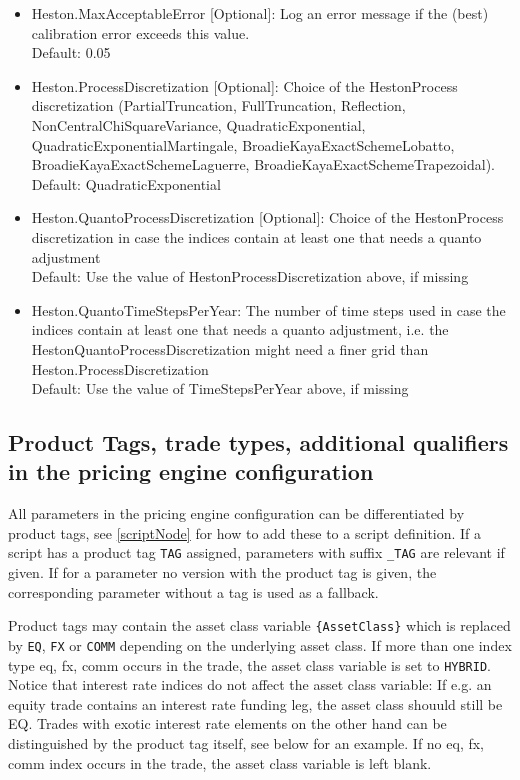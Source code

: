 \begin{itemize}
\begin{itemize}
    (root mean squared error of implied black volatilities) is below this tolerance. \\
    Default: 0.005
  \item Heston.MaxAcceptableError [Optional]: Log an error message if the (best) calibration error exceeds this value.\\
    Default: 0.05
  \item Heston.ProcessDiscretization [Optional]: Choice of the HestonProcess discretization (PartialTruncation, FullTruncation,
    Reflection, NonCentral\-Chi\-SquareVariance, Quadratic\-Exponential, Quadratic\-Exponential\-Martingale,
    Broadie\-Kaya\-Exact\-SchemeLobatto, Broadie\-Kaya\-Exact\-SchemeLaguerre, BroadieKayaExactSchemeTrapezoidal). \\
    Default: QuadraticExponential
  \item Heston.QuantoProcessDiscretization [Optional]: Choice of the HestonProcess discretization in case the indices contain
    at least one that needs a quanto adjustment \\
    Default: Use the value of HestonProcessDiscretization above, if missing
  \item Heston.QuantoTimeStepsPerYear: The number of time steps used in case the indices contain
    at least one that needs a quanto adjustment, i.e. the HestonQuantoProcessDiscretization might need a finer grid than
    Heston.ProcessDiscretization \\
    Default: Use the value of TimeStepsPerYear above, if missing
  \end{itemize}
\end{itemize}


\subsection{Product Tags, trade types, additional qualifiers in the pricing engine configuration}\label{producttags_engineconfig}

All parameters in the pricing engine configuration can be differentiated by product tags, see \ref{scriptNode} for how
to add these to a script definition. If a script has a product tag \verb+TAG+ assigned, parameters with suffix
\verb+_TAG+ are relevant if given. If for a parameter no version with the product tag is given, the corresponding
parameter without a tag is used as a fallback.

Product tags may contain the asset class variable \verb+{AssetClass}+ which is replaced by \verb+EQ+, \verb+FX+ or
\verb+COMM+ depending on the underlying asset class. If more than one index type eq, fx, comm occurs in the trade, the
asset class variable is set to \verb+HYBRID+. Notice that interest rate indices do not affect the asset class variable:
If e.g. an equity trade contains an interest rate funding leg, the asset class shouuld still be EQ. Trades with exotic
interest rate elements on the other hand can be distinguished by the product tag itself, see below for an example. If no
eq, fx, comm index occurs in the trade, the asset class variable is left blank.

